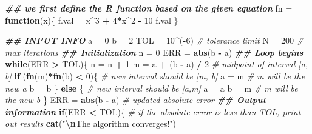 \documentclass[
]{book}
\newenvironment{Shaded}{\begin{snugshade}}{\end{snugshade}}
\newcommand{\CommentTok}[1]{\textcolor[rgb]{0.56,0.35,0.01}{\textit{#1}}}
\newcommand{\ControlFlowTok}[1]{\textcolor[rgb]{0.13,0.29,0.53}{\textbf{#1}}}
\newcommand{\DecValTok}[1]{\textcolor[rgb]{0.00,0.00,0.81}{#1}}
\newcommand{\DocumentationTok}[1]{\textcolor[rgb]{0.56,0.35,0.01}{\textbf{\textit{#1}}}}
\newcommand{\FunctionTok}[1]{\textcolor[rgb]{0.13,0.29,0.53}{\textbf{#1}}}
\newcommand{\NormalTok}[1]{#1}
\newcommand{\OtherTok}[1]{\textcolor[rgb]{0.56,0.35,0.01}{#1}}
\newcommand{\SpecialCharTok}[1]{\textcolor[rgb]{0.81,0.36,0.00}{\textbf{#1}}}
\newcommand{\StringTok}[1]{\textcolor[rgb]{0.31,0.60,0.02}{#1}}
\begin{document}
\begin{Shaded}
\begin{Highlighting}[]
\DocumentationTok{\#\# we first define the R function based on the given equation}
\NormalTok{fn }\OtherTok{=} \ControlFlowTok{function}\NormalTok{(x)\{}
\NormalTok{   f.val }\OtherTok{=}\NormalTok{   x}\SpecialCharTok{\^{}}\DecValTok{3} \SpecialCharTok{+} \DecValTok{4}\SpecialCharTok{*}\NormalTok{x}\SpecialCharTok{\^{}}\DecValTok{2} \SpecialCharTok{{-}} \DecValTok{10}
\NormalTok{   f.val}
\NormalTok{\}}

\DocumentationTok{\#\# INPUT INFO}
\NormalTok{  a }\OtherTok{=} \DecValTok{0}
\NormalTok{  b }\OtherTok{=} \DecValTok{2}
\NormalTok{  TOL }\OtherTok{=} \DecValTok{10}\SpecialCharTok{\^{}}\NormalTok{(}\SpecialCharTok{{-}}\DecValTok{6}\NormalTok{)            }\CommentTok{\# tolerance limit}
\NormalTok{  N }\OtherTok{=} \DecValTok{200}                   \CommentTok{\# max iterations}
\DocumentationTok{\#\# Initialization}
\NormalTok{  n  }\OtherTok{=} \DecValTok{0}
\NormalTok{  ERR }\OtherTok{=} \FunctionTok{abs}\NormalTok{(b }\SpecialCharTok{{-}}\NormalTok{ a)}
\DocumentationTok{\#\# Loop begins}
\ControlFlowTok{while}\NormalTok{(ERR }\SpecialCharTok{\textgreater{}}\NormalTok{ TOL)\{}
\NormalTok{  n }\OtherTok{=}\NormalTok{ n }\SpecialCharTok{+} \DecValTok{1}
\NormalTok{  m }\OtherTok{=}\NormalTok{ a }\SpecialCharTok{+}\NormalTok{ (b }\SpecialCharTok{{-}}\NormalTok{ a) }\SpecialCharTok{/} \DecValTok{2}     \CommentTok{\# midpoint of interval [a, b]}
  \ControlFlowTok{if}\NormalTok{ (}\FunctionTok{fn}\NormalTok{(m)}\SpecialCharTok{*}\FunctionTok{fn}\NormalTok{(b) }\SpecialCharTok{\textless{}} \DecValTok{0}\NormalTok{)\{   }\CommentTok{\# new interval should be [m, b]}
\NormalTok{      a }\OtherTok{=}\NormalTok{ m               }\CommentTok{\# m will be the new a}
\NormalTok{      b }\OtherTok{=}\NormalTok{ b}
\NormalTok{  \} }\ControlFlowTok{else}\NormalTok{ \{                }\CommentTok{\# new interval should be [a,m]}
\NormalTok{      a }\OtherTok{=}\NormalTok{ a}
\NormalTok{      b }\OtherTok{=}\NormalTok{ m               }\CommentTok{\# m will be the new \textquotesingle{}b\textquotesingle{}}
\NormalTok{   \}}
\NormalTok{  ERR }\OtherTok{=} \FunctionTok{abs}\NormalTok{(b }\SpecialCharTok{{-}}\NormalTok{ a)        }\CommentTok{\# updated absolute error}
  \DocumentationTok{\#\# Output information}
  \ControlFlowTok{if}\NormalTok{(ERR }\SpecialCharTok{\textless{}}\NormalTok{ TOL)\{  }\CommentTok{\# if the absolute error is less than TOL, print out results}
    \FunctionTok{cat}\NormalTok{(}\StringTok{"}\SpecialCharTok{\textbackslash{}n}\StringTok{The algorithm converges!"}\NormalTok{)}

\end{Highlighting}
\end{Shaded}
\end{document}

